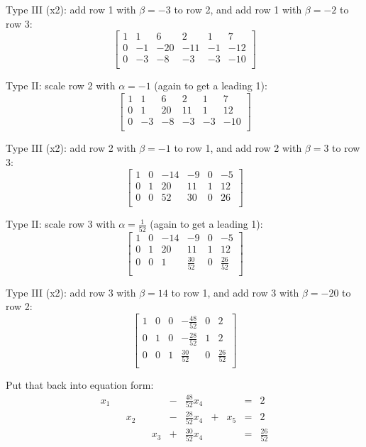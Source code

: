 Type III (x2): add row 1 with $\beta=-3$ to row 2, and add row 1 with $\beta=-2$ to row 3:
\[\left[\begin{array}{ccccc|c} 
1 & 1 & 6 & 2 &  1 & 7\\
0 & -1 & -20 & -11 &  -1 & -12\\
0 & -3 & -8 & -3 & -3 & -10\\
\end{array}\right]\]

Type II: scale row 2 with $\alpha=-1$ (again to get a leading 1):
\[\left[\begin{array}{ccccc|c} 
1 & 1 & 6 & 2 &  1 & 7\\
0 & 1 & 20 & 11 &  1 & 12\\
0 & -3 & -8 & -3 & -3 & -10\\
\end{array}\right]\]

Type III (x2): add row 2 with $\beta=-1$ to row 1, and add row 2 with $\beta=3$ to row 3:
\[\left[\begin{array}{ccccc|c} 
1 & 0 & -14 & -9 &  0 & -5\\
0 & 1 & 20 & 11 &  1 & 12\\
0 & 0 & 52 & 30 & 0 & 26\\
\end{array}\right]\]


Type II: scale row 3 with $\alpha=\frac{1}{52}$ (again to get a leading 1):
\[\left[\begin{array}{ccccc|c} 
1 & 0 & -14 & -9 &  0 & -5\\
0 & 1 & 20 & 11 &  1 & 12\\
0 & 0 & 1 & \frac{30}{52} & 0 & \frac{26}{52}\\
\end{array}\right]\]

Type III (x2): add row 3 with $\beta=14$ to row 1, and add row 3 with $\beta=-20$ to row 2:
\[\left[\begin{array}{ccccc|c} 
1 & 0 & 0 & -\frac{48}{52} &  0 & 2\\
0 & 1 & 0 & -\frac{28}{52} &  1 & 2\\
0 & 0 & 1 & \frac{30}{52} & 0 & \frac{26}{52}\\
\end{array}\right]\]

Put that back into equation form:
\[\begin{array}{rcrcrcrcrcr}
x_1 &  & & &  & - & \frac{48}{52}x_4 &  & & = & 2\\
&  & x_2 & &  & - & \frac{28}{52} x_4 & + & x_5 & = & 2\\
&  & &  & x_3 & + & \frac{30}{52}x_4 &  & & = & \frac{26}{52}\\
\end{array}\]

